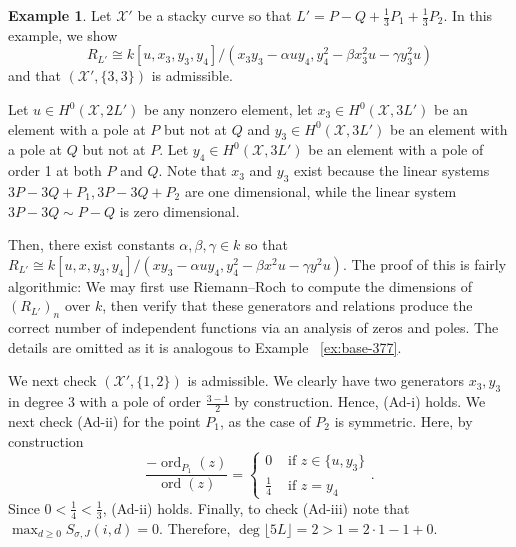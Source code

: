 \documentclass{amsart}
\theoremstyle{plain}
\theoremstyle{definition}
\newtheorem{example}[thm]{Example}
\theoremstyle{remark}
\numberwithin{equation}{section}
\newcommand \sx{\mathscr X}
\DeclareMathOperator{\ord}{ord}
\newcommand \halfcan{L}
\begin{document}
\begin{example}
\label{eg:base- 1-33}
Let $\sx'$ be a stacky curve so that $\halfcan' = P - Q + \frac{1}{3}P_1 + \frac{1}{3}P_2$. In this example, we show
$$R_{\halfcan'} \cong k[u, x_3, y_3, y_4]/(x_3 y_3- \alpha uy_4, y_4^2 - \beta x_3^2 u - \gamma y_3^2u)$$
and that $(\sx',\{3,3\})$ is admissible.

Let $u \in H^0(\sx,2\halfcan')$ be any nonzero element, let $x_3 \in H^0(\sx,3\halfcan')$ be an element with a pole at $P$ but not at $Q$ and $y_3 \in H^0(\sx,3\halfcan')$ be an element with a pole at $Q$ but not at $P$. Let $y_4 \in H^0(\sx,3\halfcan')$ be an element with a pole of order 1 at both $P$ and $Q$. Note that $x_3$ and $y_3$ exist because the linear systems $3P - 3Q + P_1, 3P - 3Q + P_2$ are one dimensional, while the linear system $3P - 3Q \sim P - Q$ is zero dimensional.

Then, there exist constants $\alpha,\beta,\gamma \in k$ so that 
$R_{\halfcan'} \cong k[u, x, y_3, y_4]/(xy_3- \alpha uy_4, y_4^2 - \beta x^2 u - \gamma y^2u).$ The proof of this is fairly algorithmic: We may first use Riemann--Roch to compute the dimensions of $(R_{\halfcan'})_n$ over $k$, then verify that these generators and relations produce the correct number of independent functions via an analysis of zeros and poles. The details are omitted as it is analogous to Example ~\ref{ex:base-377}.

We next check $(\sx',\{1,2\})$ is admissible. We clearly have two generators $x_3, y_3$ in degree 3 with a pole of order $\frac{3- 1}{2}$ by construction. Hence, (Ad-i) holds. We next check (Ad-ii) for the point $P_1$, as the case of $P_2$ is symmetric. Here, by construction
$$
\frac{-\ord_{P_1}(z)}{\ord(z)} = \begin{cases}
	0 &\text{ if }z \in \{u, y_3\}\\
	\frac{1}{4} &\text{ if }z = y_4
\end{cases}.$$
Since $0 < \frac{1}{4} < \frac{1}{3}$, (Ad-ii) holds.
Finally, to check (Ad-iii) note that $\max_{d \geq 0}S_{\sigma,J}(i,d) = 0.$ Therefore, $\deg \lfloor 5L \rfloor  = 2 > 1 = 2 \cdot 1 - 1 + 0$.
\end{example}
\end{document}

